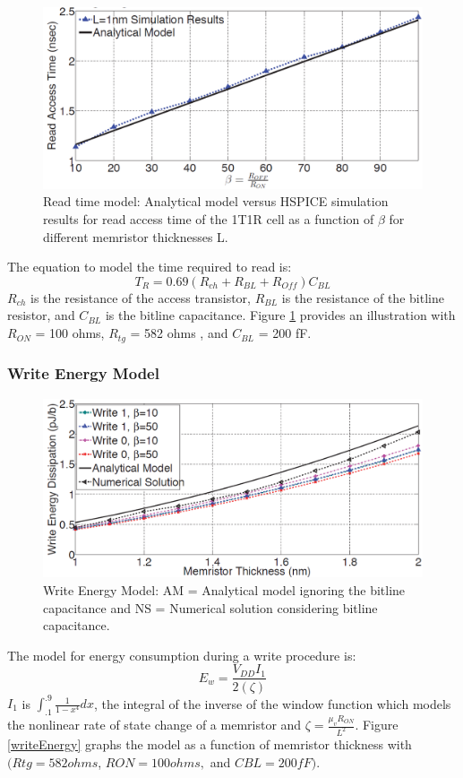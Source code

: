 \documentclass{sig-alternate}
\begin{document}
\begin{figure}
  \includegraphics[scale=.29]{readTime.png}
  \caption{Read time model: Analytical model versus HSPICE simulation results
for read access time of the 1T1R cell as a function of $\beta$ for
different memristor thicknesses L.}
  \label{fig:readTime}
\end{figure}
The equation to model the time required to read is:
\begin{equation*}
T_{R} = 0.69(R_{ch} + R_{BL} + R_{Off})C_{BL}
\end{equation*}
$R_{ch}$ is the resistance of the access transistor, $R_{BL}$ is the resistance of the bitline resistor, and $C_{BL}$ is the bitline capacitance. Figure \ref{fig:readTime} provides an illustration with $R_{ON}$ = 100 ohms, $R_{tg}$ = 582 ohms , and  $C_{BL}$ = 200 fF.

\subsubsection{Write Energy Model} 
\begin{figure}
  \includegraphics[scale=.29]{writeEnergy.png}
  \caption{ Write Energy Model: AM = Analytical model ignoring the bitline capacitance and NS = Numerical solution considering bitline capacitance.}
  \label{fig:writeEnergy}
\end{figure}
The model for energy consumption during a write procedure is:
\begin{equation*}
E_{w} = \frac{V_{DD}I_{1}}{2(\zeta)}
\end{equation*}
$I_{1}$ is $\int_{.1}^{.9} \frac{1}{1-x^4} dx$, the integral of the inverse of the window function which models the nonlinear rate of state change of a memristor and $\zeta = \frac{\mu _{v}R_{ON}}{L^2}$.  Figure \ref{writeEnergy} graphs the model as a function of memristor thickness with $(Rtg = 582 ohms$, $RON = 100 ohms ,$ and $CBL = 200fF)$.
\end{document}
